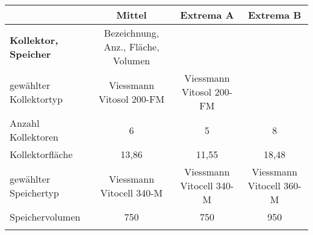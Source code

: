 \begin{table}[]
{\begin{tabular}{lclcc}
    \multicolumn{1}{|l|}{}                                                               & \multicolumn{2}{c|}{\cellcolor[HTML]{9AFF99}\textbf{Mittel}}                                                               & \multicolumn{1}{c|}{\textbf{Extrema A}}       & \multicolumn{1}{c|}{\textbf{Extrema B}}       \\ \hline
    \multicolumn{1}{|l|}{\textbf{Kollektor, Speicher}}                                   & \multicolumn{2}{c|}{\cellcolor[HTML]{9AFF99}Bezeichnung, Anz., Fläche, Volumen}                                            & \multicolumn{1}{c|}{}                         & \multicolumn{1}{c|}{}                         \\ \hline
    \multicolumn{1}{|l|}{gewählter Kollektortyp}                                         & \multicolumn{2}{c|}{\cellcolor[HTML]{9AFF99}Viessmann Vitosol 200-FM}                                                      & \multicolumn{1}{c|}{Viessmann Vitosol 200-FM} & \multicolumn{1}{c|}{}                         \\ \hline
    \multicolumn{1}{|l|}{Anzahl Kollektoren}                                             & \multicolumn{2}{c|}{\cellcolor[HTML]{9AFF99}6}                                                                             & \multicolumn{1}{c|}{5}                        & \multicolumn{1}{c|}{8}                        \\ \hline
    \multicolumn{1}{|l|}{Kollektorfläche}                                                & \multicolumn{2}{c|}{\cellcolor[HTML]{9AFF99}13,86}                                                                         & \multicolumn{1}{c|}{11,55}                    & \multicolumn{1}{c|}{18,48}                    \\ \hline
    \multicolumn{1}{|l|}{gewählter Speichertyp}                                          & \multicolumn{2}{c|}{\cellcolor[HTML]{9AFF99}Viessmann Vitocell 340-M}                                                      & \multicolumn{1}{c|}{Viessmann Vitocell 340-M} & \multicolumn{1}{c|}{Viessmann Vitocell 360-M} \\ \hline
    \multicolumn{1}{|l|}{Speichervolumen}                                                & \multicolumn{2}{c|}{\cellcolor[HTML]{9AFF99}750}                                                                           & \multicolumn{1}{c|}{750}                      & \multicolumn{1}{c|}{950}                      \\ \hline
                                                                                         & \cellcolor[HTML]{9AFF99}                                   & \cellcolor[HTML]{9AFF99}                                      &                                               &                                               \\ \hline

\end{tabular}}
\end{table}
